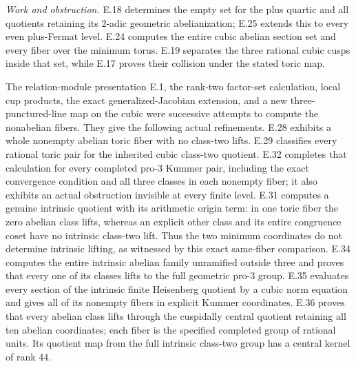 \noindent\emph{Work and obstruction.}
E.18 determines the empty set for the plus quartic and all
quotients retaining its $2$-adic geometric abelianization;
E.25 extends this to every even plus-Fermat level. E.24 computes
the entire cubic abelian section set and every fiber over the
minimum torus. E.19 separates the three rational cubic cusps
inside that set, while E.17 proves their collision under the
stated toric map.

The relation-module presentation E.1, the rank-two factor-set
calculation, local cup products, the exact generalized-Jacobian
extension, and a new three-punctured-line map on the cubic were
successive attempts to compute the nonabelian fibers. They give
the following actual refinements. E.28 exhibits a whole
nonempty abelian toric fiber with no class-two lifts. E.29
classifies every rational toric pair for the inherited cubic
class-two quotient. E.32 completes that calculation for every
completed pro-$3$ Kummer pair, including the exact convergence
condition and all three classes in each nonempty fiber; it also
exhibits an actual obstruction invisible at every finite level.
E.31 computes a genuine intrinsic quotient with its
arithmetic origin term: in one toric fiber the zero abelian
class lifts, whereas an explicit other class and its entire
congruence coset have no intrinsic class-two lift. Thus the
two minimum coordinates do not determine intrinsic lifting,
as witnessed by this exact same-fiber comparison.
E.34 computes the entire intrinsic abelian family unramified
outside three and proves that every one of its classes lifts
to the full geometric pro-$3$ group.
E.35 evaluates every section of the intrinsic finite
Heisenberg quotient by a cubic norm equation and gives all
of its nonempty fibers in explicit Kummer coordinates.
E.36 proves that every abelian class lifts through the
cuspidally central quotient retaining all ten abelian
coordinates; each fiber is the specified completed group
of rational units. Its quotient map from the full
intrinsic class-two group has a central kernel of rank $44$.

